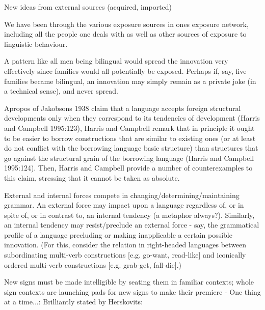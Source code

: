 New ideas from external sources (acquired, imported)

	We have been through the various exposure sources in ones exposure network, including all the people one deals with as well as other sources of exposure to linguistic behaviour. 

A pattern like all men being bilingual would spread the innovation very effectively since families would all potentially be exposed. Perhaps if, say, five families became bilingual, an innovation may simply remain as a private joke (in a technical sense), and never spread. 


	Apropos of Jakobsons 1938 claim that a language accepts foreign structural developments only when they correspond to its tendencies of development (Harris and Campbell 1995:123), Harris and Campbell remark that in principle it ought to be easier to borrow constructions that are similar to existing ones (or at least do not conflict with the borrowing language basic structure) than structures that go against the structural grain of the borrowing language (Harris and Campbell 1995:124). Then, Harris and Campbell provide a number of counterexamples to this claim, stressing that it cannot be taken as absolute.

External and internal forces compete in changing/determining/maintaining grammar. An external force may impact upon a language regardless of, or in spite of, or in contrast to, an internal tendency (a metaphor always?). Similarly, an internal tendency may resist/preclude an external force - say, the grammatical profile of a language precluding or making inapplicable a certain possible innovation. (For this, consider the relation in right-headed languages between subordinating multi-verb constructions [e.g. go-want, read-like] and iconically ordered multi-verb constructions [e.g. grab-get, fall-die].)

New signs must be made intelligible by seating them in familiar contexts; whole sign contexts are launching pads for new signs to make their premiere - One thing at a time...: Brilliantly stated by Herskovits:

